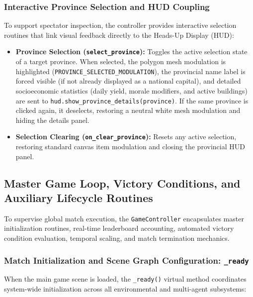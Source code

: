 \subsubsection{Interactive Province Selection and HUD Coupling}
To support spectator inspection, the controller provides interactive selection routines that link visual feedback directly to the Heads-Up Display (HUD):

\begin{itemize}
    \item \textbf{Province Selection (\texttt{select\_province}):} Toggles the active selection state of a target province. When selected, the polygon mesh modulation is highlighted (\texttt{PROVINCE\_SELECTED\_MODULATION}), the provincial name label is forced visible (if not already displayed as a national capital), and detailed socioeconomic statistics (daily yield, morale modifiers, and active buildings) are sent to \texttt{hud.show\_province\_details(province)}. If the same province is clicked again, it deselects, restoring a neutral white mesh modulation and hiding the details panel.
    \item \textbf{Selection Clearing (\texttt{on\_clear\_province}):} Resets any active selection, restoring standard canvas item modulation and closing the provincial HUD panel.
\end{itemize}

\subsection{Master Game Loop, Victory Conditions, and Auxiliary Lifecycle Routines}
\label{subsec:game_controller_lifecycle}

To supervise global match execution, the \texttt{GameController} encapsulates master initialization routines, real-time leaderboard accounting, automated victory condition evaluation, temporal scaling, and match termination mechanics.

\subsubsection{Match Initialization and Scene Graph Configuration: \texttt{\_ready}}
When the main game scene is loaded, the \texttt{\_ready()} virtual method coordinates system-wide initialization across all environmental and multi-agent subsystems:

